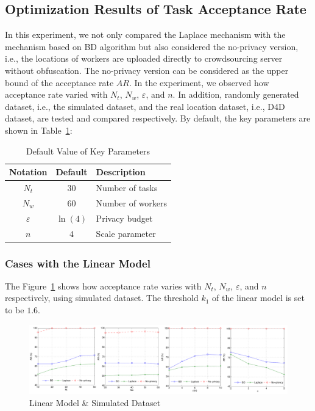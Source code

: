 \subsection{Optimization Results of Task Acceptance Rate} %
In this experiment, we not only compared the Laplace mechanism with the mechanism based on BD algorithm but also considered the no-privacy version, i.e., the locations of workers are uploaded directly to crowdsourcing server without obfuscation. The no-privacy version can be considered as the upper bound of the acceptance rate $AR$. In the experiment, we observed how acceptance rate varied with $N_t$, $N_w$, $\varepsilon$, and $n$. In addition, randomly generated dataset, i.e., the simulated dataset, and the real location dataset, i.e., D4D dataset, are tested and compared respectively. By default, the key parameters are shown in Table~\ref{tab:deft}:
\begin{table}
  \caption{Default Value of Key Parameters}
  \label{tab:deft}
  \begin{tabular}{ccl}
    \toprule
    Notation & Default & Description\\
    \midrule
    $N_t$ & $30$ & Number of tasks\\
    $N_w$ & $60$ & Number of workers\\
    $\varepsilon$ & $\ln (4)$ & Privacy budget\\
    $n$ & $4$ & Scale parameter\\
  \bottomrule
\end{tabular}
\end{table}

\subsubsection{Cases with the Linear Model}
The Figure~\ref{img:LinSim} shows how acceptance rate varies with $N_t$, $N_w$, $\varepsilon$, and $n$ respectively, using simulated dataset. The threshold $k_1$ of the linear model is set to be $1.6$.

\begin{figure}
\includegraphics[width=1\textwidth]{LinSim}
\caption{Linear Model \& Simulated Dataset}
\label{img:LinSim}
\end{figure}

